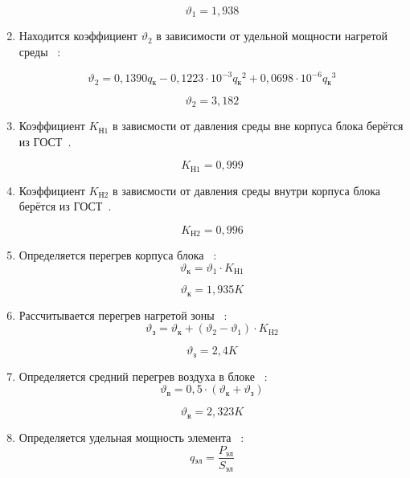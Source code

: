 \begin{enumerate}[label={\arabic*.}]
$$\vartheta_1=1,938$$

\item Находится коэффициент $\vartheta_2$ в зависимости от удельной мощности нагретой среды ~\cite{Rotkop1976}:

\begin{equation}
\vartheta_2 = 0,1390q\mathrm{_к} - 0,1223 \cdot 10^{-3}q\mathrm{_к}^2 + 0,0698 \cdot 10^{-6}q\mathrm{_к}^3
\end{equation}

$$\vartheta_2=3,182$$

\item Коэффициент $K\mathrm{_{Н1}}$ в зависмости от давления
  среды вне корпуса блока берётся из ГОСТ~\cite{GOST-15150-69}.

  $$K\mathrm{_{Н1}} = 0,999$$

  \item Коэффициент $K\mathrm{_{Н2}}$ в зависмости от давления
  среды внутри корпуса блока берётся из ГОСТ~\cite{GOST-15150-69}.

  $$K\mathrm{_{Н2}} = 0,996$$

\item Определяется перегрев корпуса блока ~\cite{Rotkop1976}:
  \begin{equation}
    \vartheta\mathrm{_к} = \vartheta_1 \cdot K\mathrm{_{Н1}}
  \end{equation}
  
  $$\vartheta\mathrm{_к} = 1,935 K$$

\item Рассчитывается перегрев нагретой зоны ~\cite{Rotkop1976}:
    \begin{equation}
    \vartheta\mathrm{_з} = \vartheta\mathrm{_к} + (\vartheta_2 - \vartheta_1) \cdot K\mathrm{_{H2}}
    \end{equation}

    $$\vartheta\mathrm{_з} = 2,4 K$$

  \item Определяется средний перегрев воздуха в блоке ~\cite{Rotkop1976}:
        \begin{equation}
      \vartheta\mathrm{_в} = 0,5 \cdot (\vartheta\mathrm{_к} + \vartheta\mathrm{_з})
    \end{equation}

    $$\vartheta\mathrm{_в} = 2,323 K$$

  \item Определяется удельная мощность элемента ~\cite{Rotkop1976}:
    \begin{equation}
      q\mathrm{_{эл}} = \frac{P\mathrm{_{эл}}}{S\mathrm{_{эл}}}
    \end{equation}


\end{enumerate}
